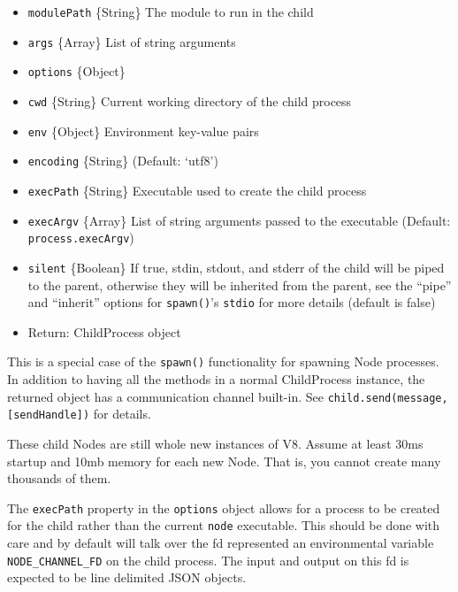 \begin{itemize}
\itemsep1pt\parskip0pt
\item
  \texttt{modulePath} \{String\} The module to run in the child
\item
  \texttt{args} \{Array\} List of string arguments
\item
  \texttt{options} \{Object\}
\item
  \texttt{cwd} \{String\} Current working directory of the child process
\item
  \texttt{env} \{Object\} Environment key-value pairs
\item
  \texttt{encoding} \{String\} (Default: `utf8')
\item
  \texttt{execPath} \{String\} Executable used to create the child
  process
\item
  \texttt{execArgv} \{Array\} List of string arguments passed to the
  executable (Default: \texttt{process.execArgv})
\item
  \texttt{silent} \{Boolean\} If true, stdin, stdout, and stderr of the
  child will be piped to the parent, otherwise they will be inherited
  from the parent, see the ``pipe'' and ``inherit'' options for
  \texttt{spawn()}'s \texttt{stdio} for more details (default is false)
\item
  Return: ChildProcess object
\end{itemize}

This is a special case of the \texttt{spawn()} functionality for
spawning Node processes. In addition to having all the methods in a
normal ChildProcess instance, the returned object has a communication
channel built-in. See \texttt{child.send(message, {[}sendHandle{]})} for
details.

These child Nodes are still whole new instances of V8. Assume at least
30ms startup and 10mb memory for each new Node. That is, you cannot
create many thousands of them.

The \texttt{execPath} property in the \texttt{options} object allows for
a process to be created for the child rather than the current
\texttt{node} executable. This should be done with care and by default
will talk over the fd represented an environmental variable
\texttt{NODE\_CHANNEL\_FD} on the child process. The input and output on
this fd is expected to be line delimited JSON objects.

